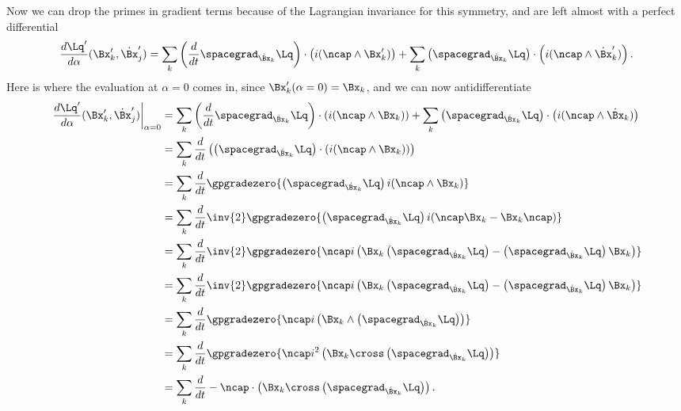 {\begin{equation}
\end{equation}
%
Now we can drop the primes in gradient terms because of the Lagrangian invariance for this symmetry, and are left almost with a
perfect differential
%
\begin{equation}\label{eqn:goldsteinCh12:520}
\frac{d \Lq'}{d\alpha} (\Bx_k', \dot{\Bx}_j')
= \sum_{k} \left( \frac{d}{dt} \spacegrad_{\dot{\Bx}_k} \Lq\right) \cdot \left( i (\ncap \wedge \Bx_k') \right)
+ \sum_{k} \left( \spacegrad_{\dot{\Bx}_k} \Lq\right) \cdot \left( i (\ncap \wedge \dot{\Bx}_k') \right) .
\end{equation}
%
Here is where the evaluation at \(\alpha=0\) comes in, since \(\Bx_k'(\alpha=0) = \Bx_k\), and we can now antidifferentiate
%
\begin{equation}\label{eqn:goldsteinCh12:540}
\begin{aligned}
{\left. \frac{d \Lq'}{d\alpha} (\Bx_k', \dot{\Bx}_j') \right\vert}_{\alpha=0}
&= \sum_{k} \left( \frac{d}{dt} \spacegrad_{\dot{\Bx}_k} \Lq\right) \cdot \left( i (\ncap \wedge \Bx_k) \right)
+ \sum_{k} \left( \spacegrad_{\dot{\Bx}_k} \Lq\right) \cdot \left( i (\ncap \wedge \dot{\Bx}_k) \right) \\
&= \sum_{k} \frac{d}{dt} \left( \left( \spacegrad_{\dot{\Bx}_k} \Lq\right) \cdot \left( i (\ncap \wedge \Bx_k) \right) \right) \\
&= \sum_{k} \frac{d}{dt} \gpgradezero{ \left( \spacegrad_{\dot{\Bx}_k} \Lq \right) i (\ncap \wedge \Bx_k) } \\
&= \sum_{k} \frac{d}{dt} \inv{2} \gpgradezero{ \left( \spacegrad_{\dot{\Bx}_k} \Lq \right) i (\ncap \Bx_k - \Bx_k \ncap) } \\
&= \sum_{k} \frac{d}{dt} \inv{2} \gpgradezero{
\ncap i \left( \Bx_k \left( \spacegrad_{\dot{\Bx}_k} \Lq \right) -  \left( \spacegrad_{\dot{\Bx}_k} \Lq \right) \Bx_k \right)
} \\
&= \sum_{k} \frac{d}{dt} \inv{2} \gpgradezero{
\ncap i \left( \Bx_k \left( \spacegrad_{\dot{\Bx}_k} \Lq \right) -  \left( \spacegrad_{\dot{\Bx}_k} \Lq \right) \Bx_k \right)
} \\
&= \sum_{k} \frac{d}{dt} \gpgradezero{
\ncap i \left(\Bx_k \wedge \left( \spacegrad_{\dot{\Bx}_k} \Lq \right) \right)
} \\
&= \sum_{k} \frac{d}{dt} \gpgradezero{
\ncap i^2 \left(\Bx_k \cross \left( \spacegrad_{\dot{\Bx}_k} \Lq \right) \right)
} \\
&= \sum_{k} \frac{d}{dt} -\ncap \cdot \left(\Bx_k \cross \left( \spacegrad_{\dot{\Bx}_k} \Lq \right) \right) .
\end{aligned}

\end{equation}}
